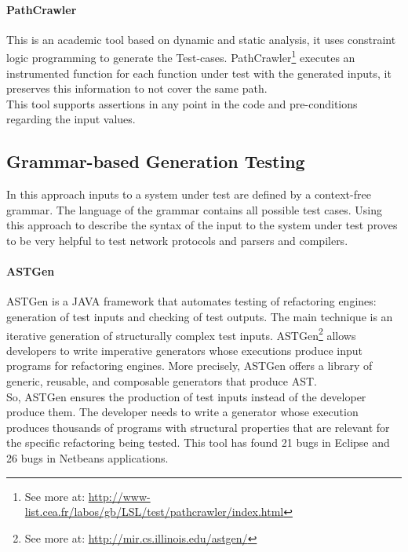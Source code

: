 \paragraph{PathCrawler} This is an academic tool based on dynamic and static analysis\cite{Williams05pathcrawler:automatic}, 
it uses constraint logic programming to generate the Test-cases. PathCrawler\footnote{See more at: \url{http://www-list.cea.fr/labos/gb/LSL/test/pathcrawler/index.html}} executes an instrumented function for each function under test
with the generated inputs, it preserves this information to not cover the same path.\\
This tool supports assertions in any point in the code and pre-conditions regarding the input values.

\subsection{Grammar-based Generation Testing}
In this approach inputs to a system under test are defined by a context-free grammar. The language of the grammar contains all possible test cases.
Using this approach to describe the syntax of the input to the system under test proves to be very helpful to test
network protocols\cite{tal:syntax-based,kaksonen2001functional} and parsers and compilers\cite{1994-burgess,Burgess_Saidi_1996}.

\paragraph{ASTGen}
ASTGen\cite{Daniel:2007:ATR:1287624.1287651} is a JAVA framework that automates testing of refactoring engines: generation of test inputs
and checking of test outputs. The main technique is an iterative generation of structurally complex test inputs.
ASTGen\footnote{See more at: \url{http://mir.cs.illinois.edu/astgen/}} allows developers to write imperative generators whose executions
produce input programs for refactoring engines. More precisely, ASTGen
offers a library of generic, reusable, and composable generators that produce \ac{AST}.\\
So, ASTGen ensures the production of test inputs instead of the developer produce them. The developer needs to write a generator whose execution
produces thousands of programs with structural properties that are relevant for the specific refactoring being tested. This tool has found
21 bugs in Eclipse and 26 bugs in Netbeans applications.

